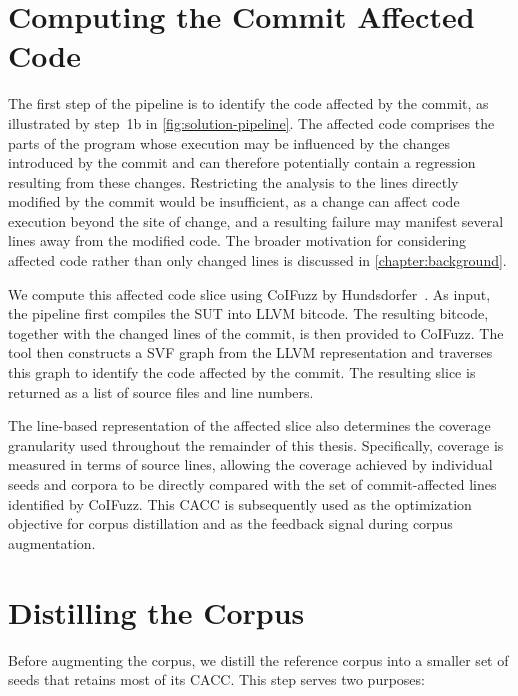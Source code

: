 \section{Computing the Commit Affected Code}
\label{sec:affected-code}

The first step of the pipeline is to identify the code affected by the commit, as illustrated by step~1b in \cref{fig:solution-pipeline}. The affected code comprises the parts of the program whose execution may be influenced by the changes introduced by the commit and can therefore potentially contain a regression resulting from these changes. Restricting the analysis to the lines directly modified by the commit would be insufficient, as a change can affect code execution beyond the site of change, and a resulting failure may manifest several lines away from the modified code. The broader motivation for considering affected code rather than only changed lines is discussed in \cref{chapter:background}.

We compute this affected code slice using CoIFuzz by Hundsdorfer~\cite{zotero-item-324}. As input, the pipeline first compiles the \ac{SUT} into LLVM bitcode. The resulting bitcode, together with the changed lines of the commit, is then provided to CoIFuzz. The tool then constructs a \ac{SVF} graph from the LLVM representation and traverses this graph to identify the code affected by the commit. The resulting slice is returned as a list of source files and line numbers.

The line-based representation of the affected slice also determines the coverage granularity used throughout the remainder of this thesis. Specifically, coverage is measured in terms of source lines, allowing the coverage achieved by individual seeds and corpora to be directly compared with the set of commit-affected lines identified by CoIFuzz. This \ac{CACC} is subsequently used as the optimization objective for corpus distillation and as the feedback signal during corpus augmentation.

\section{Distilling the Corpus}
\label{sec:distilling-corpus}



Before augmenting the corpus, we distill the reference corpus into a smaller set of seeds that retains most of its \ac{CACC}.
This step serves two purposes:

